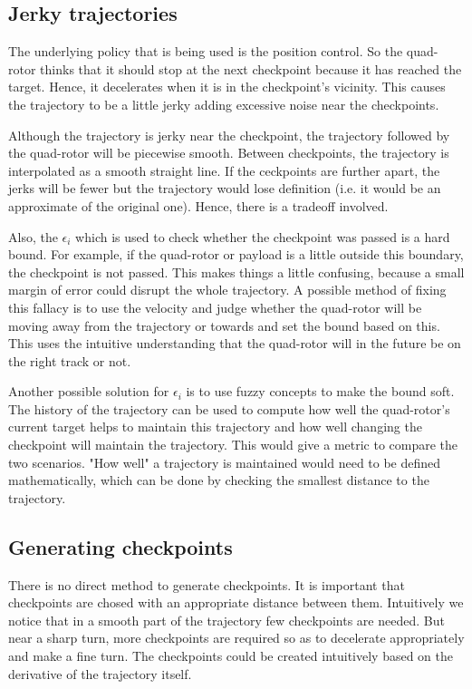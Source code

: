 \documentclass[hidelinks,BTech]{iitmdiss}
\begin{document}
\subsection{Jerky trajectories}
The underlying policy that is being used is the position control. So the quad-rotor thinks that it should stop at the next checkpoint because it has reached the target. Hence, it decelerates when it is in the checkpoint's vicinity. This causes the trajectory to be a little jerky adding excessive noise near the checkpoints.

Although the trajectory is jerky near the checkpoint, the trajectory followed by the quad-rotor will be piecewise smooth. Between checkpoints, the trajectory is interpolated as a smooth straight line. If the ceckpoints are further apart, the jerks will be fewer but the trajectory would lose definition (i.e. it would be an approximate of the original one). Hence, there is a tradeoff involved.

Also, the $\epsilon_i$ which is used to check whether the checkpoint was passed is a hard bound. For example, if the quad-rotor or payload is a little outside this boundary, the checkpoint is not passed. This makes things a little confusing, because a small margin of error could disrupt the whole trajectory. A possible method of fixing this fallacy is to use the velocity and judge whether the quad-rotor will be moving away from the trajectory or towards and set the bound based on this. This uses the intuitive understanding that the quad-rotor will in the future be on the right track or not.

Another possible solution for $\epsilon_i$ is to use fuzzy concepts to make the bound soft. The history of the trajectory can be used to compute how well the quad-rotor's current target helps to maintain this trajectory and how well changing the checkpoint will maintain the trajectory. This would give a metric to compare the two scenarios. "How well" a trajectory is maintained would need to be defined mathematically, which can be done by checking the smallest distance to the trajectory.

\subsection{Generating checkpoints}
There is no direct method to generate checkpoints. It is important that checkpoints are chosed with an appropriate distance between them. Intuitively we notice that in a smooth part of the trajectory few checkpoints are needed. But near a sharp turn, more checkpoints are required so as to decelerate appropriately and make a fine turn. The checkpoints could be created intuitively based on the derivative of the trajectory itself.
\end{document}

